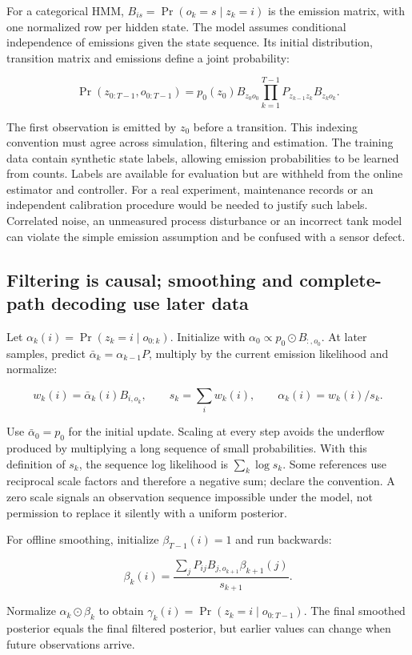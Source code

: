 \documentclass[11pt,a4paper]{article}
\begin{document}
For a categorical HMM, $B_{is}=\Pr(o_k=s\mid z_k=i)$ is the emission matrix, with one normalized row per hidden state. The model assumes conditional independence of emissions given the state sequence. Its initial distribution, transition matrix and emissions define a joint probability:


\[\Pr(z_{0:T-1},o_{0:T-1})=p_0(z_0)B_{z_0o_0}\prod_{k=1}^{T-1}P_{z_{k-1}z_k}B_{z_ko_k}.\]

The first observation is emitted by $z_0$ before a transition. This indexing convention must agree across simulation, filtering and estimation. The training data contain synthetic state labels, allowing emission probabilities to be learned from counts. Labels are available for evaluation but are withheld from the online estimator and controller. For a real experiment, maintenance records or an independent calibration procedure would be needed to justify such labels. Correlated noise, an unmeasured process disturbance or an incorrect tank model can violate the simple emission assumption and be confused with a sensor defect.


\subsection{Filtering is causal; smoothing and complete-path decoding use later data}

Let $\alpha_k(i)=\Pr(z_k=i\mid o_{0:k})$. Initialize with $\alpha_0\propto p_0\odot B_{:,o_0}$. At later samples, predict $\bar\alpha_k=\alpha_{k-1}P$, multiply by the current emission likelihood and normalize:


\[w_k(i)=\bar\alpha_k(i)B_{i,o_k},\qquad s_k=\sum_iw_k(i),\qquad \alpha_k(i)=w_k(i)/s_k.\]

Use $\bar\alpha_0=p_0$ for the initial update. Scaling at every step avoids the underflow produced by multiplying a long sequence of small probabilities. With this definition of $s_k$, the sequence log likelihood is $\sum_k\log s_k$. Some references use reciprocal scale factors and therefore a negative sum; declare the convention. A zero scale signals an observation sequence impossible under the model, not permission to replace it silently with a uniform posterior.


For offline smoothing, initialize $\beta_{T-1}(i)=1$ and run backwards:


\[\beta_k(i)=\frac{\sum_jP_{ij}B_{j,o_{k+1}}\beta_{k+1}(j)}{s_{k+1}}.\]

Normalize $\alpha_k\odot\beta_k$ to obtain $\gamma_k(i)=\Pr(z_k=i\mid o_{0:T-1})$. The final smoothed posterior equals the final filtered posterior, but earlier values can change when future observations arrive.
\end{document}
